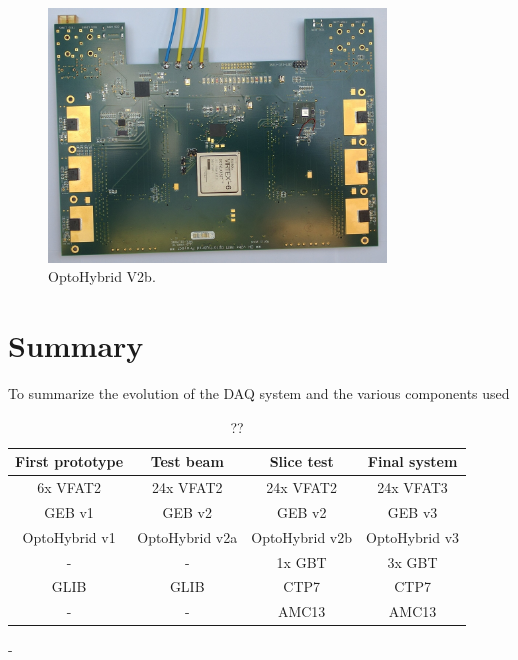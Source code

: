       \begin{figure}[h!]
        \centering
        \includegraphics[width=0.8\textwidth]{img/II-2-daq/oh-v2b.jpg}
        \caption{OptoHybrid V2b.}
        \label{fig:II-2-ohv2b}
      \end{figure}

  \section{Summary}


    To summarize the evolution of the DAQ system and the various components used

    \begin{table}
      \begin{tabularx}{\textwidth}{C{1}C{1}C{1}C{1}}
        \textbf{First prototype} & \textbf{Test beam}   & \textbf{Slice test}  & \textbf{Final system} \\ \hline
        6x VFAT2        & 24x VFAT2   & 24x VFAT2   & 24x VFAT3 \\
        GEB v1          & GEB v2      & GEB v2      & GEB v3 \\
        OptoHybrid v1           & OptoHybrid v2a      & OptoHybrid v2b      & OptoHybrid v3 \\
        -               & -           & 1x GBT      & 3x GBT \\
        GLIB            & GLIB        & CTP7        & CTP7 \\
        -               & -           & AMC13       & AMC13 \\
      \end{tabularx}
      \caption{??}
      \label{tab:II-2-summary}
    \end{table}
































-
